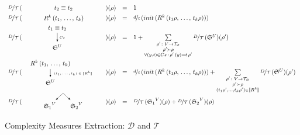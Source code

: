\begin{figure}[t]
\[
\begin{array}{rclcl}
 \mathcal{\nicefrac{D}{T}}\,(&\parbox[m]{1.3cm}{\schemenode{$\unigoal{t_2}{t_2}$}}&)(\rho) &=& 1  \\

 \mathcal{\nicefrac{D}{T}}\,(&\parbox[m]{2.5cm}{\schemenode{$\invokegoal{R^k}{t_1}{t_k}$}}&)(\rho) &=& \nicefrac{d}{t}\,(init\,(\invokegoal{R^k}{t_1 \rho}{t_k \rho})) \\

 \mathcal{\nicefrac{D}{T}}\,(&\parbox[m]{2cm}{\schemesarrow{$\unigoal{t_1}{t_2}$}{$Cs$}{$\schemewithvset{\mathfrak{S}}{U}$}} &)(\rho) &=& 1 +
      \sum\limits_{\substack{ \rho' \colon V \to \grterms \\
                                      \rho' \succ \rho \\
                                      \forall (y, t) \in Cs\,:\, \rho'\,(y) = t\, \rho'  }}
           \mathcal{\nicefrac{D}{T}}\,(\schemewithvset{\mathfrak{S}}{U})(\rho')  \\

 \mathcal{\nicefrac{D}{T}}\,(& \parbox[m]{4cm}{\schemedarrow{$\invokegoal{R^k}{t_1}{t_k}$}{ $(t_1, \dots, t_k) \in \sembr{R^k}  $}{$\schemewithvset{\mathfrak{S}}{U}$}} &)(\rho) &=&
      \nicefrac{d}{t}\,(init\,(\invokegoal{R^k}{t_1 \rho}{t_k \rho})) +
      \sum\limits_{\substack{ \rho' \colon V \to \grterms \\
                                      \rho' \succ \rho \\
                                      (t_1 \rho', \dots, t_k \rho') \in \sembr{R^k}  }}
           \mathcal{\nicefrac{D}{T}}\,(\schemewithvset{\mathfrak{S}}{U})(\rho')  \\

 \mathcal{\nicefrac{D}{T}}\,(&\parbox[m]{2.5cm}{\schemefork{$\schemewithvset{\mathfrak{S}_1}{V}$}{$\schemewithvset{\mathfrak{S}_2}{V}$}}&)(\rho) &=&
 \mathcal{\nicefrac{D}{T}}\,(\schemewithvset{\mathfrak{S}_1}{V})(\rho) + \mathcal{\nicefrac{D}{T}}\,(\schemewithvset{\mathfrak{S}_2}{V})(\rho)
\end{array}
\]
\caption{Complexity Measures Extraction: $\mathcal D$ and $\mathcal T$}
\label{fig:scheduling_extraction_d_t}
\end{figure}

